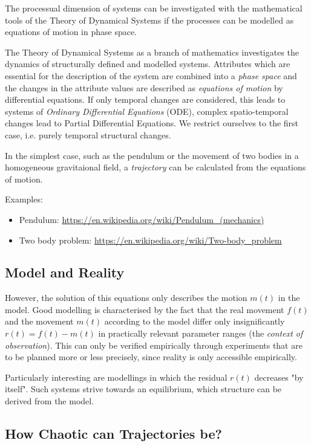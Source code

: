 \documentclass[11pt,a4paper]{article}
\begin{document}
The processual dimension of systems can be investigated with the mathematical
tools of the Theory of Dynamical Systems if the processes can be modelled as
equations of motion in phase space.

The Theory of Dynamical Systems as a branch of mathematics investigates the
dynamics of structurally defined and modelled systems. Attributes which are
essential for the description of the system are combined into a \emph{phase
  space} and the changes in the attribute values are described as
\emph{equations of motion} by differential equations. If only temporal changes
are considered, this leads to systems of \emph{Ordinary Differential
  Equations} (ODE), complex spatio-temporal changes lead to Partial
Differential Equations. We restrict ourselves to the first case, i.e. purely
temporal structural changes.

In the simplest case, such as the pendulum or the movement of two bodies in a
homogeneous gravitaional field, a \emph{trajectory} can be calculated from the
equations of motion.

Examples:
\begin{itemize}
\item Pendulum: \url{https://en.wikipedia.org/wiki/Pendulum_(mechanics)}
\item Two body problem: \url{https://en.wikipedia.org/wiki/Two-body_problem}
\end{itemize}

\subsection{Model and Reality}

However, the solution of this equations only describes the motion $m(t)$ in
the model. Good modelling is characterised by the fact that the real movement
$f(t)$ and the movement $m(t)$ according to the model differ only
insignificantly $r(t)=f(t)-m(t)$ in practically relevant parameter ranges (the
\emph{context of observation}). This can only be verified empirically through
experiments that are to be planned more or less precisely, since reality is
only accessible empirically.

Particularly interesting are modellings in which the residual $r(t)$ decreases
"by itself". Such systems strive towards an equilibrium, which structure can
be derived from the model.

\subsection{How Chaotic can Trajectories be?} 
\end{document}
